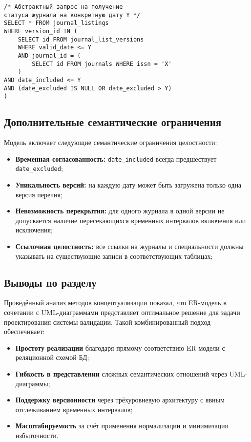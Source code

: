 \begin{verbatim}
/* Абстрактный запрос на получение 
статуса журнала на конкретную дату Y */
SELECT * FROM journal_listings
WHERE version_id IN (
    SELECT id FROM journal_list_versions
    WHERE valid_date <= Y
    AND journal_id = (
        SELECT id FROM journals WHERE issn = 'X'
    )
AND date_included <= Y
AND (date_excluded IS NULL OR date_excluded > Y)
)
\end{verbatim}

\subsection*{Дополнительные семантические ограничения}

Модель включает следующие семантические ограничения целостности:
\begin{itemize} 
	\item \textbf{Временная согласованность:} {\small\texttt{date\_included}} всегда предшествует {\small\texttt{date\_excluded}};
	\item \textbf{Уникальность версий:} на каждую дату может быть загружена только одна версия перечня;
	\item \textbf{Невозможность перекрытия:} для одного журнала в одной версии не допускается наличие пересекающихся временных интервалов включения или исключения;
	\item \textbf{Ссылочная целостность:} все ссылки на журналы и специальности должны указывать на существующие записи в соответствующих таблицах;
\end{itemize}

\subsection*{Выводы по разделу}

Проведённый анализ методов концептуализации показал, что ER-модель в сочетании с
UML-диаграммами представляет оптимальное решение для задачи проектирования системы
валидации. Такой комбинированный подход обеспечивает:

\begin{itemize}
	\item \textbf{Простоту реализации} благодаря прямому соответствию ER-модели с реляционной схемой БД;
	\item \textbf{Гибкость в представлении} сложных семантических отношений через UML-диаграммы;
	\item \textbf{Поддержку версионности} через трёхуровневую архитектуру с явным отслеживанием временных интервалов;
	\item \textbf{Масштабируемость} за счёт применения нормализации и минимизации избыточности.
\end{itemize}

